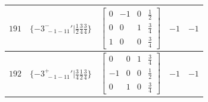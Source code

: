 \documentclass[fleqn,8pt]{jsarticle}
\begin{document}
\begin{longtable}{ccccc}
$ 191 $ & $ \{-3^{-}_{\,\,-1-11}{}'|\frac{1}{2} \frac{3}{4} \frac{3}{4}\} $ & $ \begin{bmatrix} 0 & -1 & 0 & \frac{1}{2} \\ 0 & 0 & 1 & \frac{3}{4} \\ 1 & 0 & 0 & \frac{3}{4} \end{bmatrix} $ & $ -1 $ & $ -1 $ \\ \hline
$ 192 $ & $ \{-3^{+}_{\,\,-1-11}{}'|\frac{3}{4} \frac{1}{2} \frac{3}{4}\} $ & $ \begin{bmatrix} 0 & 0 & 1 & \frac{3}{4} \\ -1 & 0 & 0 & \frac{1}{2} \\ 0 & 1 & 0 & \frac{3}{4} \end{bmatrix} $ & $ -1 $ & $ -1 $ \\
\end{longtable}
\end{document}
